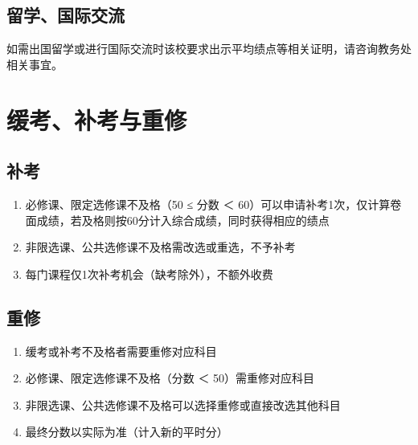 \noindent{}

\subsection[留学、国际交流]{留学、国际交流}
如需出国留学或进行国际交流时该校要求出示平均绩点等相关证明，请咨询教务处相关事宜。

\section[缓考、补考与重修]{缓考、补考与重修}
\label{retake}

\subsection[补考]{补考}
\begin{enumerate}
    \item 必修课、限定选修课不及格（50 ≤ 分数 ＜ 60）可以申请补考1次，仅计算卷面成绩，若及格则按60分计入综合成绩，同时获得相应的绩点
    \item 非限选课、公共选修课不及格需改选或重选，不予补考
    \item 每门课程仅1次补考机会（缺考除外），不额外收费
\end{enumerate}

\subsection[重修]{重修}
\begin{enumerate}
    \item 缓考或补考不及格者需要重修对应科目
    \item 必修课、限定选修课不及格（分数 ＜ 50）需重修对应科目
    \item 非限选课、公共选修课不及格可以选择重修或直接改选其他科目
    \item 最终分数以实际为准（计入新的平时分）
\end{enumerate}

